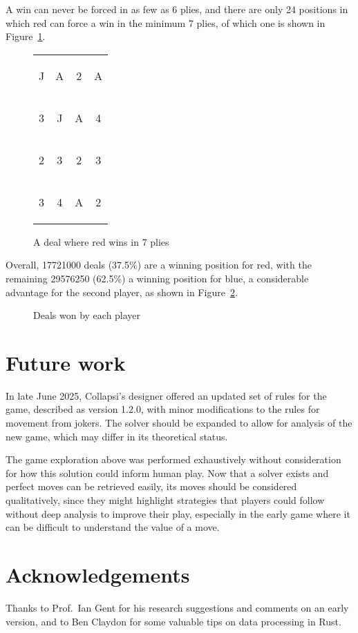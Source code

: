 \documentclass[a4paper, twocolumn]{article}
\newcommand\card[1]{\begin{tcolorbox}#1\end{tcolorbox}}
\newcommand\board[8]{
  \setlength{\tabcolsep}{0.1cm}
  \begin{tabular}{c c c c}
    \card{#1} & \card{#2} & \card{#3} & \card{#4} \\
    \card{#5} & \card{#6} & \card{#7} & \card{#8} \\
    \boardmore
}
\newcommand\boardmore[8]{
    \card{#1} & \card{#2} & \card{#3} & \card{#4} \\
    \card{#5} & \card{#6} & \card{#7} & \card{#8}
  \end{tabular}
}
\begin{document}
A win can never be forced in as few as 6 plies, and there are only 24 positions
in which red can force a win in the minimum 7 plies, of which one is shown in
Figure~\ref{fig:win-in-7}.

\begin{figure}[ht]
  \centering
  \board JA2A 3JA4 2323 34A2
  \caption{A deal where red wins in 7 plies}
  \label{fig:win-in-7}
\end{figure}

Overall, 17721000 deals (37.5\%) are a winning position for red, with the remaining
29576250 (62.5\%) a winning position for blue, a considerable advantage for the second
player, as shown in Figure~\ref{fig:win-chance}.

\begin{figure}[ht]
  \centering
  \caption{Deals won by each player}
  \label{fig:win-chance}
\end{figure}


\section{Future work}

In late June 2025, Collapsi's designer offered an updated set of rules for the
game, described as version 1.2.0, with minor modifications to the rules for movement from
jokers. The solver should be expanded to allow for analysis of the new game,
which may differ in its theoretical status.

The game exploration above was performed exhaustively without consideration for how
this solution could inform human play. Now that a solver exists and perfect
moves can be retrieved easily, its moves should be considered qualitatively,
since they might highlight strategies that players could follow without deep
analysis to improve their play, especially in the early game where it can be
difficult to understand the value of a move.


\section{Acknowledgements}

Thanks to Prof.~Ian Gent for his research suggestions and comments on an early
version, and to Ben Claydon for some valuable tips on data processing in Rust.
\end{document}
